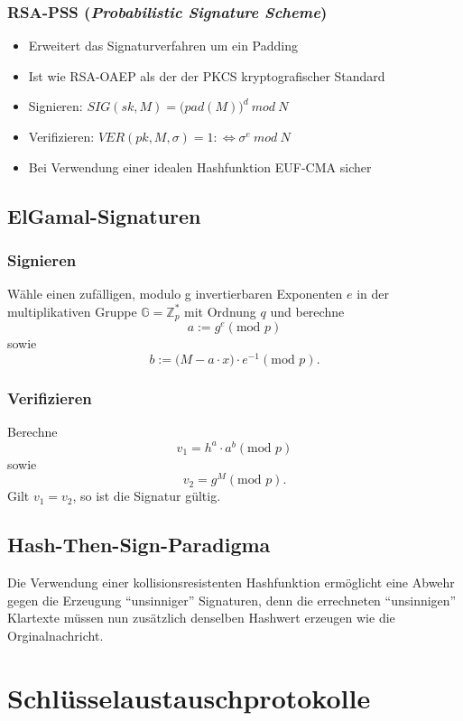 \subsubsection{RSA-PSS (\textit{Probabilistic Signature Scheme})}
\begin{itemize}
	\item Erweitert das Signaturverfahren um ein Padding
	\item Ist wie RSA-OAEP als der der PKCS kryptografischer Standard
	\item Signieren: \(SIG(sk,M) = \big(pad(M)\big)^d~mod~N\)
	\item Verifizieren: \(VER(pk,M,\sigma)=1 :\Leftrightarrow \sigma^e~mod~N\)
	\item Bei Verwendung einer idealen Hashfunktion EUF-CMA sicher
\end{itemize}


\subsection{ElGamal-Signaturen}

\subsubsection{Signieren}
Wähle einen zufälligen, modulo g invertierbaren Exponenten \(e\) in der multiplikativen Gruppe \(\mathbb{G}=\mathbb{Z}_{p}^*\) mit Ordnung \(q\) und berechne
\[a := g^e (\text{mod } p)\]
sowie
\[b := \big(M - a \cdot x \big) \cdot e^{-1}(\text{mod } p).\]

\subsubsection{Verifizieren}
Berechne
\[v_1 = h^a \cdot a^b (\text{mod } p)\]
sowie
\[v_2 = g^M (\text{mod } p).\]
Gilt \(v_1=v_2\), so ist die Signatur gültig.


\subsection{Hash-Then-Sign-Paradigma}
Die Verwendung einer kollisionsresistenten Hashfunktion ermöglicht eine Abwehr gegen die Erzeugung "`unsinniger"' Signaturen, denn die errechneten "`unsinnigen"' Klartexte müssen nun zusätzlich denselben Hashwert erzeugen wie die Orginalnachricht.



\section{Schlüsselaustauschprotokolle}

